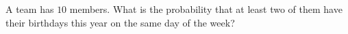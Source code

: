 A team has $10$ members. What is the probability that at least two of them have their birthdays this year on the same day of the week?
